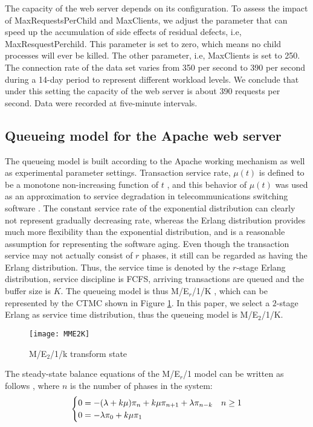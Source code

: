 \documentclass[10pt,journal,letterpaper,compsoc]{IEEEtran}
\begin{document}
The capacity of the web server depends on its configuration.
To assess the impact of MaxRequestsPerChild and MaxClients,
we adjust the parameter that can speed up the accumulation of side effects
of residual defects, i.e, MaxResquestPerchild.
This parameter is set to zero, which means no child processes will
ever be killed.
The other parameter, i.e, MaxClients is set to 250.
The connection rate of the data set varies from 350 per second to 390
per second during a 14-day period to represent different workload levels.
We conclude that under this setting the capacity of the web server is
about 390 requests per second.
Data were recorded at five-minute intervals.

\subsection{Queueing model for the Apache web server} %
\label{subsec:queueingModel}
The queueing model is built according to the Apache working mechanism as
well as experimental parameter settings.
Transaction service rate, $\mu(t)$ is defined to be a monotone
non-increasing function of $t$ \cite{ChScience:SGarg1998IEEEJC},
and this behavior of $\mu(t)$ was used as an approximation to service
degradation in telecommunications
switching software \cite{ChScience:AAvritzer1997ESE}.
The constant service rate of the exponential distribution can clearly
not represent gradually decreasing rate,
whereas the Erlang distribution provides much more flexibility
than the exponential distribution,
and is a reasonable assumption for representing the software aging.
Even though the transaction service may not actually consist of $r$ phases,
it still can be regarded as having the Erlang distribution.
Thus, the service time is denoted by the $r$-stage Erlang distribution,
service discipline is FCFS,
arriving transactions are queued and the buffer size is $K$.
The queueing model is thus M/E$_r$/1/K \cite{ChScience:KSTrivedi2001PS},
which can be represented by the CTMC shown in Figure \ref{fig:MME2K}.
In this paper, we select a $2$-stage Erlang as service time distribution,
thus the queueing model is M/E$_2$/1/K.

\begin{figure}[htb]
\centering
\texttt{[image: MME2K]}
\caption{M/E$_2$/1/k transform state}
\label{fig:MME2K}
\end{figure}

The steady-state balance equations of the M/E$_r$/1 model can be
written as follows \cite{ChScience:DGross1985FQ},
where $n$ is the number of phases in the system:
\begin{eqnarray}
\label{equ:eq1}
  \begin{cases}
    0=-(\lambda+k\mu)\pi_n+k\mu \pi_{n+1}+\lambda \pi_{n-k} & n\geq 1 \cr
    0=-\lambda \pi_0+k\mu \pi_1 &
  \end{cases}
\end{eqnarray}
\end{document}
